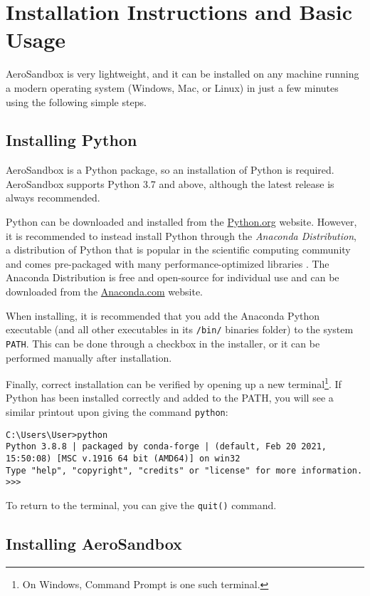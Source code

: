 \chapter{Installation Instructions and Basic Usage}
\label{chapter:installation}

AeroSandbox is very lightweight, and it can be installed on any machine running a modern operating system (Windows, Mac, or Linux) in just a few minutes using the following simple steps.


\section{Installing Python}

AeroSandbox is a Python package, so an installation of Python is required. AeroSandbox supports Python 3.7 and above, although the latest release is always recommended.

Python can be downloaded and installed from the \url{Python.org} website. However, it is recommended to instead install Python through the \textit{Anaconda Distribution}, a distribution of Python that is popular in the scientific computing community and comes pre-packaged with many performance-optimized libraries \cite{anaconda}. The Anaconda Distribution is free and open-source for individual use and can be downloaded from the \url{Anaconda.com} website.

When installing, it is recommended that you add the Anaconda Python executable (and all other executables in its \texttt{/bin/} binaries folder) to the system \texttt{PATH}. This can be done through a checkbox in the installer, or it can be performed manually after installation.

Finally, correct installation can be verified by opening up a new terminal\footnote{On Windows, Command Prompt is one such terminal.}. If Python has been installed correctly and added to the PATH, you will see a similar printout upon giving the command \texttt{python}:

\begin{verbatim}
C:\Users\User>python
Python 3.8.8 | packaged by conda-forge | (default, Feb 20 2021, 15:50:08) [MSC v.1916 64 bit (AMD64)] on win32
Type "help", "copyright", "credits" or "license" for more information.
>>>
\end{verbatim}

To return to the terminal, you can give the \texttt{quit()} command.


\section{Installing AeroSandbox}


